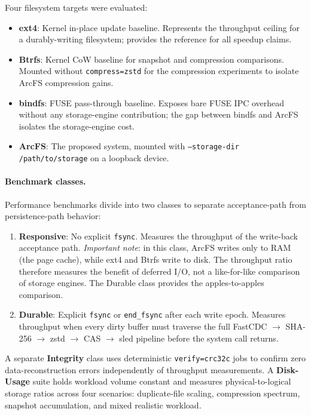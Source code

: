 \documentclass[journal]{IEEEtran}
\begin{document}
Four filesystem targets were evaluated:

\begin{itemize}
\item \textbf{ext4}: Kernel in-place update baseline.  Represents the
  throughput ceiling for a durably-writing filesystem; provides the
  reference for all speedup claims.
\item \textbf{Btrfs}: Kernel CoW baseline for snapshot and compression
  comparisons.  Mounted without \texttt{compress=zstd} for the
  compression experiments to isolate ArcFS compression gains.
\item \textbf{bindfs}: FUSE pass-through baseline.  Exposes bare FUSE
  IPC overhead without any storage-engine contribution; the gap between
  bindfs and ArcFS isolates the storage-engine cost.
\item \textbf{ArcFS}: The proposed system, mounted with
  \texttt{--storage-dir /path/to/storage} on a loopback device.
\end{itemize}

\paragraph{Benchmark classes.}
Performance benchmarks divide into two classes to separate acceptance-path
from persistence-path behavior:
\begin{enumerate}
\item \textbf{Responsive}: No explicit \texttt{fsync}. Measures the
  throughput of the write-back acceptance path.  \emph{Important note}:
  in this class, ArcFS writes only to RAM (the page cache), while ext4
  and Btrfs write to disk.  The throughput ratio therefore measures the
  benefit of deferred I/O, not a like-for-like comparison of storage
  engines.  The Durable class provides the apples-to-apples comparison.
\item \textbf{Durable}: Explicit \texttt{fsync} or \texttt{end\_fsync}
  after each write epoch. Measures throughput when every dirty buffer
  must traverse the full FastCDC $\to$ SHA-256 $\to$ zstd $\to$ CAS
  $\to$ sled pipeline before the system call returns.
\end{enumerate}

A separate \textbf{Integrity} class uses deterministic
\texttt{verify=crc32c} jobs to confirm zero data-reconstruction errors
independently of throughput measurements. A \textbf{Disk-Usage} suite holds
workload volume constant and measures physical-to-logical storage ratios
across four scenarios: duplicate-file scaling, compression spectrum,
snapshot accumulation, and mixed realistic workload.
\end{document}
